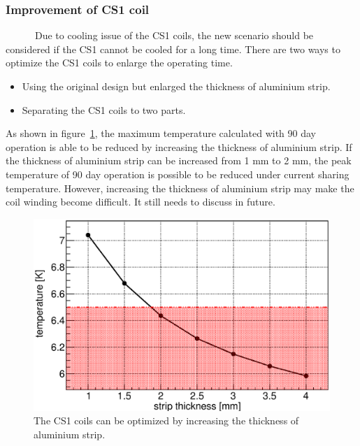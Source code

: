 \subsubsection{Improvement of CS1 coil}
~~~~~~Due to cooling issue of the CS1 coils, the new scenario should be considered if the CS1 cannot be cooled for a long time.
There are two ways to optimize the CS1 coils to enlarge the operating time.
\begin{itemize}
 \setlength{\itemsep}{-5pt}
 \item Using the original design but enlarged the thickness of aluminium strip.
 \item Separating the CS1 coils to two parts.
\end{itemize}
As shown in figure~\ref{5opti}, the maximum temperature calculated with 90 day operation is able to be reduced by increasing the thickness of aluminium strip.
If the thickness of aluminium strip can be increased from 1 mm to 2 mm, the peak temperature of 90 day operation is possible to be reduced under current sharing temperature.
However, increasing the thickness of aluminium strip may make the coil winding become difficult.
It still needs to discuss in future.
\begin{figure}[H]
 \centering
 \includegraphics[scale=0.45]{chapter6/fig/Strip.eps}
 \caption{ The CS1 coils can be optimized by increasing the thickness of aluminium strip.}
 \label{5opti}
\end{figure}

